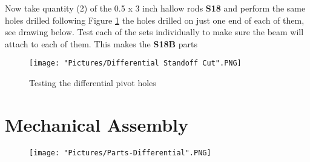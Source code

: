 \documentclass[12pt]{article}
\begin{document}
\noindent Now take quantity (2) of the 0.5 x 3 inch hallow rods \textbf{S18} and perform the same holes drilled following Figure \ref{dpv} the holes drilled on just one end of each of them, see drawing below. Test each of the sets individually to make sure the beam will attach to each of them. This makes the \textbf{S18B} parts

\begin{figure}[H]
	\centering
	\texttt{[image: "Pictures/Differential Standoff Cut".PNG]}
	\caption{Testing the differential pivot holes}
	\label{dpv}
\end{figure}

\newpage

\section{Mechanical Assembly}


\begin{figure}[H]
	\centering
	\texttt{[image: "Pictures/Parts-Differential".PNG]}
\end{figure}
\end{document}
